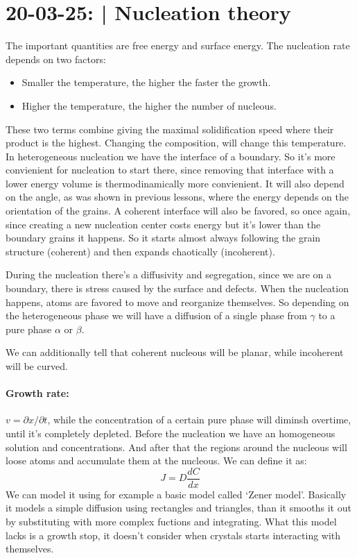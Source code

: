 \section{20-03-25: | Nucleation theory}

The important quantities are free energy and surface energy. The nucleation rate depends on two factors:
\begin{itemize}
    \item Smaller the temperature, the higher the faster the growth.
    \item Higher the temperature, the higher the number of nucleous.
\end{itemize}
These two terms combine giving the maximal solidification speed where their product is the highest. Changing the composition, will change this temperature. In heterogeneous nucleation we have the interface of a boundary. So it's more convienient for nucleation to start there, since removing that interface with a lower energy volume is thermodinamically more convienient. It will also depend on the angle, as was shown in previous lessons, where the energy depends on the orientation of the grains. A coherent interface will also be favored, so once again, since creating a new nucleation center costs energy but it's lower than the boundary grains it happens. So it starts almost always following the grain structure (coherent) and then expands chaotically (incoherent).

During the nucleation there's a diffusivity and segregation, since we are on a boundary, there is stress caused by the surface and defects. When the nucleation happens, atoms are favored to move and reorganize themselves. So depending on the heterogeneous phase we will have a diffusion of a single phase from $\gamma$ to a pure phase $\alpha$ or $\beta$.

We can additionally tell that coherent nucleous will be planar, while incoherent will be curved.

\paragraph{Growth rate:} $v = \partial x / \partial t$, while the concentration of a certain pure phase will diminsh overtime, until it's completely depleted. Before the nucleation we have an homogeneous solution and concentrations. And after that the regions around the nucleous will loose atoms and accumulate them at the nucleous. We can define it as:
\begin{equation}
    J = D \frac{dC}{dx}
\end{equation}
We can model it using for example a basic model called `Zener model'. Basically it models a simple diffusion using rectangles and triangles, than it smooths it out by substituting with more complex fuctions and integrating. What this model lacks is a growth stop, it doesn't consider when crystals starts interacting with themselves.